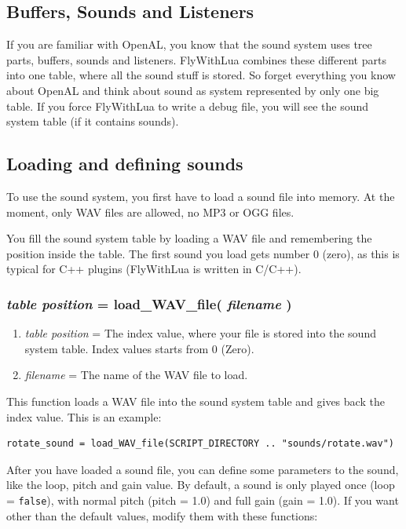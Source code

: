 \documentclass[11pt,parskip=half,a4paper]{scrartcl}
\begin{document}
\subsection{Buffers, Sounds and Listeners}

If you are familiar with OpenAL, you know that the sound system uses tree parts, buffers, sounds and listeners. FlyWithLua combines these different parts into one table, where all the sound stuff is stored. So forget everything you know about OpenAL and think about sound as system represented by only one big table. If you force FlyWithLua to write a debug file, you will see the sound system table (if it contains sounds).

\subsection{Loading and defining sounds}

To use the sound system, you first have to load a sound file into memory. At the moment, only WAV files are allowed, no MP3 or OGG files.

You fill the sound system table by loading a WAV file and remembering the position inside the table. The first sound you load gets number 0 (zero), as this is typical for C++ plugins (FlyWithLua is written in C/C++).

\subsubsection{\emph{table position} = load\_WAV\_file( \emph{filename} )}

\begin{enumerate}
	\item \emph{table position} = The index value, where your file is stored into the sound system table. Index values starts from 0 (Zero).
	\item \emph{filename} = The name of the WAV file to load.
\end{enumerate}

This function loads a WAV file into the sound system table and gives back the index value. This is an example:


\begin{lstlisting}
rotate_sound = load_WAV_file(SCRIPT_DIRECTORY .. "sounds/rotate.wav")
\end{lstlisting}

After you have loaded a sound file, you can define some parameters to the sound, like the loop, pitch and gain value. By default, a sound is only played once (loop = \verb|false|), with normal pitch (pitch = 1.0) and full gain (gain = 1.0). If you want other than the default values, modify them with these functions:
\end{document}

